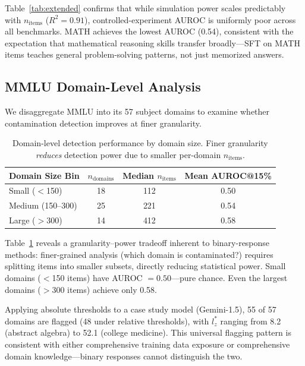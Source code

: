 \documentclass[11pt]{article}
\begin{document}
Table~\ref{tab:extended} confirms that while simulation power scales predictably with $n_\text{items}$ ($R^2 = 0.91$), controlled-experiment AUROC is uniformly poor across all benchmarks.
MATH achieves the lowest AUROC (0.54), consistent with the expectation that mathematical reasoning skills transfer broadly---SFT on MATH items teaches general problem-solving patterns, not just memorized answers.

\subsection{MMLU Domain-Level Analysis}
\label{sec:domain}

We disaggregate MMLU into its 57 subject domains to examine whether contamination detection improves at finer granularity.

\begin{table}[t]
\centering
\caption{Domain-level detection performance by domain size. Finer granularity \emph{reduces} detection power due to smaller per-domain $n_\text{items}$.}
\label{tab:domain-auroc}
\begin{tabular}{lccc}
\toprule
Domain Size Bin & $n_\text{domains}$ & Median $n_\text{items}$ & Mean AUROC@15\% \\
\midrule
Small ($<$150)     & 18 & 112 & 0.50 \\
Medium (150--300)  & 25 & 221 & 0.54 \\
Large ($>$300)     & 14 & 412 & 0.58 \\
\bottomrule
\end{tabular}
\end{table}

Table~\ref{tab:domain-auroc} reveals a granularity--power tradeoff inherent to binary-response methods: finer-grained analysis (which domain is contaminated?) requires splitting items into smaller subsets, directly reducing statistical power.
Small domains ($<$150 items) have AUROC $= 0.50$---pure chance.
Even the largest domains ($>$300 items) achieve only 0.58.

Applying absolute thresholds to a case study model (Gemini-1.5), 55 of 57 domains are flagged (48 under relative thresholds), with $l_z^*$ ranging from 8.2 (abstract algebra) to 52.1 (college medicine).
This universal flagging pattern is consistent with either comprehensive training data exposure or comprehensive domain knowledge---binary responses cannot distinguish the two.

\end{document}
